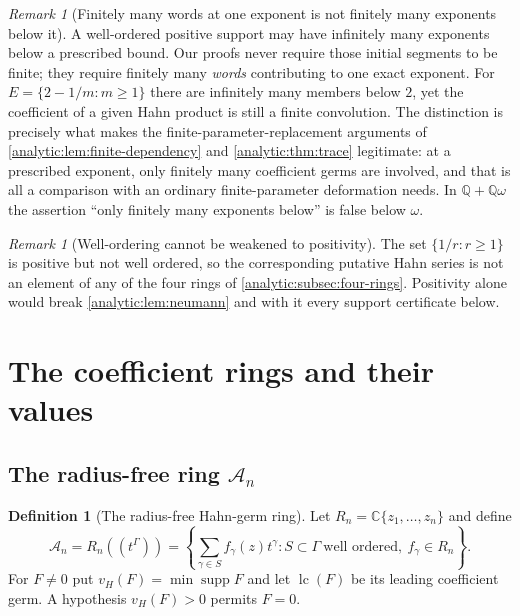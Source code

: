 \documentclass[11pt,letterpaper]{article}
\theoremstyle{definition}
\newtheorem{definition}[theorem]{Definition}
\theoremstyle{remark}
\newtheorem{remark}[theorem]{Remark}
\newcommand{\C}{\mathbb C}
\newcommand{\Q}{\mathbb Q}
\newcommand{\A}{\mathscr A}
\newcommand{\supp}{\operatorname{supp}}
\newcommand{\lc}{\operatorname{lc}}
\newcommand{\vH}{v_{\!H}}
\numberwithin{equation}{section}
\begin{document}
\begin{remark}[Finitely many words at one exponent is not finitely many
exponents below it]\label{analytic:rem:initial-segments}
A well-ordered positive support may have infinitely many exponents below a
prescribed bound. Our proofs never require those initial segments to be
finite; they require finitely many \emph{words} contributing to one exact
exponent. For $E=\{2-1/m:m\ge1\}$ there are infinitely many members below
$2$, yet the coefficient of a given Hahn product is still a finite
convolution. The distinction is precisely what makes the
finite-parameter-replacement arguments of
\cref{analytic:lem:finite-dependency} and
\cref{analytic:thm:trace} legitimate: at a prescribed exponent, only
finitely many coefficient germs are involved, and that is all a comparison
with an ordinary finite-parameter deformation needs. In $\Q+\Q\omega$ the
assertion ``only finitely many exponents below'' is false below $\omega$.
\end{remark}

\begin{remark}[Well-ordering cannot be weakened to positivity]
\label{analytic:rem:positivity}
The set $\{1/r:r\ge1\}$ is positive but not well ordered, so the
corresponding putative Hahn series is not an element of any of the four
rings of \cref{analytic:subsec:four-rings}. Positivity alone would break
\cref{analytic:lem:neumann} and with it every support certificate below.
\end{remark}

\section{The coefficient rings and their values}\label{analytic:sec:germs}

\subsection{The radius-free ring $\A_n$}\label{analytic:subsec:ringA}
\begin{definition}[The radius-free Hahn-germ ring]\label{analytic:def:ringA}
Let $R_n=\C\{z_1,\ldots,z_n\}$ and define
\begin{equation}\label{analytic:eq:ringA}
 \A_n=R_n((t^\Gamma))
 =\left\{\sum_{\gamma\in S}f_\gamma(z)t^\gamma:
 S\subset\Gamma\ \text{well ordered},\ f_\gamma\in R_n\right\}.
\end{equation}
For $F\ne0$ put $\vH(F)=\min\supp F$ and let $\lc(F)$ be its leading
coefficient germ. A hypothesis $\vH(F)>0$ permits $F=0$.
\end{definition}
\end{document}
